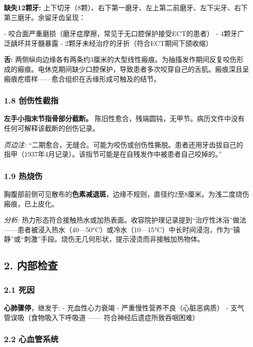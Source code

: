 \noindent \textbf{缺失12颗牙:} 上下切牙（8颗）、右下第一磨牙、左上第二前磨牙、左下尖牙、右下第三磨牙。余留牙齿呈现：

\noindent - 咬合面严重磨损（磨牙症摩擦，常见于无口腔保护接受ECT的患者）
- 4颗牙广泛龋坏并牙髓暴露
- 2颗牙未经治疗的牙折（符合ECT期间下颌收缩）

\noindent \textbf{舌:} 两侧纵向边缘各有两条约3厘米的大型线性瘢痕。为抽搐发作期间反复咬伤形成的瘢痕。电休克期间缺少口腔保护，导致患者多次咬穿自己的舌肌。瘢痕深且呈瘢痕疙瘩样——愈合组织在舌缘形成可触及的结节。

\subsubsection*{1.8 创伤性截指}

\noindent \textbf{左手小指末节指骨部分截断。} 陈旧性愈合，残端圆钝，无甲节。病历文件中没有任何可解释该截断的创伤记录。

\noindent \textit{页边注:} “二期愈合，无缝合。可能为咬伤或创伤性撕脱。患者还用牙齿拔自己的指甲（1937年4月记录）。该指节可能是在自残发作中被患者自己咬掉的。”

\subsubsection*{1.9 热烧伤}

\noindent 胸腹部前侧可见散布的\textbf{色素减退斑}，边缘不规则，直径约2至8厘米。为浅二度烧伤瘢痕，已上皮化。

\noindent \textit{分析:} 热力形态符合接触热水或加热表面。收容院护理记录提到“治疗性沐浴”做法——患者被浸入热水（40—50°C）或冷水（10—15°C）中长时间浸泡，作为“镇静”或“刺激”手段。烧伤无几何形状，提示浸烫而非接触加热物体。

\subsection*{2. 内部检查}

\subsubsection*{2.1 死因}

\noindent \textbf{心肺骤停}，继发于:
- 充血性心力衰竭
- 严重慢性营养不良（心脏恶病质）
- 支气管误吸（食物吸入下呼吸道 —— 符合神经后遗症所致吞咽困难）

\subsubsection*{2.2 心血管系统}

